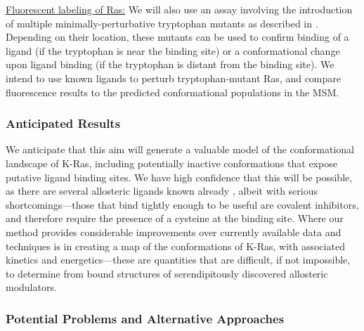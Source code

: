 \documentclass[12pt]{article}
\begin{document}
\underline{Fluorescent labeling of Ras:} We will also use an assay involving the introduction of multiple minimally-perturbative tryptophan mutants as described in \cite{trpmut}. Depending on their location, these mutants can be used to confirm binding of a ligand (if the tryptophan is near the binding site) or a conformational change upon ligand binding (if the tryptophan is distant from the binding site). We intend to use known ligands to perturb tryptophan-mutant Ras, and compare fluorescence results to the predicted conformational populations in the MSM.

  \subsubsection*{Anticipated Results}
  We anticipate that this aim will generate a valuable model of the conformational landscape of K-Ras, including potentially inactive conformations that expose putative ligand binding sites. We have high confidence that this will be possible, as there are several allosteric ligands known already \cite{ostrem2013} \cite{fesik}, albeit with serious shortcomings---those that bind tightly enough to be useful are covalent inhibitors, and therefore require the presence of a cysteine at the binding site. Where our method provides considerable improvements over currently available data and techniques is in creating a map of the conformations of K-Ras, with associated kinetics and energetics---these are quantities that are difficult, if not impossible, to determine from bound structures of serendipitously discovered allosteric modulators.
  
  \subsubsection*{Potential Problems and Alternative Approaches}
  
\end{document}
